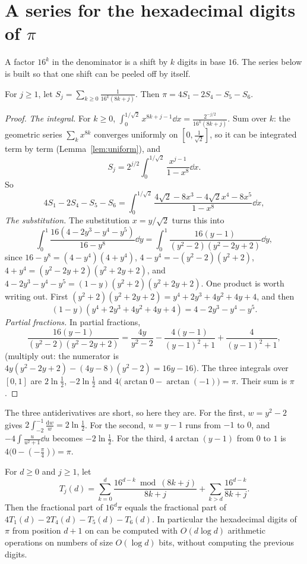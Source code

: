 \section{A series for the hexadecimal digits of $\pi$}

A factor $16^k$ in the denominator is a shift by $k$ digits in base $16$. The series below is built so that one shift can be peeled off by itself.

\begin{theorem}\label{thm:bbp}
For $j\ge1$, let $S_j=\sum_{k\ge0}\frac1{16^k(8k+j)}$. Then $\pi=4S_1-2S_4-S_5-S_6$.
\end{theorem}

\begin{proof}
\emph{The integral.}
For $k\ge0$, $\int_0^{1/\sqrt2}x^{8k+j-1}\dd x=\frac{2^{-j/2}}{16^k(8k+j)}$. Sum over $k$: the geometric series $\sum_kx^{8k}$ converges uniformly on $[0,\frac1{\sqrt2}]$, so it can be integrated term by term (Lemma~\ref{lem:uniform}), and
\[
S_j=2^{j/2}\int_0^{1/\sqrt2}\frac{x^{j-1}}{1-x^8}\dd x.
\]
So
\[
4S_1-2S_4-S_5-S_6=\int_0^{1/\sqrt2}\frac{4\sqrt2-8x^3-4\sqrt2x^4-8x^5}{1-x^8}\dd x,
\]
\emph{The substitution.}
The substitution $x=y/\sqrt2$ turns this into
\[
\int_0^1\frac{16(4-2y^3-y^4-y^5)}{16-y^8}\dd y=\int_0^1\frac{16(y-1)}{(y^2-2)(y^2-2y+2)}\dd y,
\]
since $16-y^8=(4-y^4)(4+y^4)$, $4-y^4=-(y^2-2)(y^2+2)$, $4+y^4=(y^2-2y+2)(y^2+2y+2)$, and $4-2y^3-y^4-y^5=(1-y)(y^2+2)(y^2+2y+2)$. One product is worth writing out. First $(y^2+2)(y^2+2y+2)=y^4+2y^3+4y^2+4y+4$, and then
\[
(1-y)(y^4+2y^3+4y^2+4y+4)=4-2y^3-y^4-y^5.
\]
\emph{Partial fractions.}
In partial fractions,
\[
\frac{16(y-1)}{(y^2-2)(y^2-2y+2)}=\frac{4y}{y^2-2}-\frac{4(y-1)}{(y-1)^2+1}+\frac4{(y-1)^2+1},
\]
(multiply out: the numerator is $4y(y^2-2y+2)-(4y-8)(y^2-2)=16y-16$). The three integrals over $[0,1]$ are $2\ln\frac12$, $-2\ln\frac12$ and $4\bigl(\arctan0-\arctan(-1)\bigr)=\pi$. Their sum is $\pi$.
\end{proof}

The three antiderivatives are short, so here they are. For the first, $w=y^2-2$ gives $2\int_{-2}^{-1}\frac{\mathrm dw}w=2\ln\frac12$. For the second, $u=y-1$ runs from $-1$ to $0$, and $-4\int\frac{u}{u^2+1}\dd u$ becomes $-2\ln\frac12$. For the third, $4\arctan(y-1)$ from $0$ to $1$ is $4\bigl(0-(-\frac\pi4)\bigr)=\pi$.

\begin{proposition}\label{prop:digits}
For $d\ge0$ and $j\ge1$, let
\[
T_j(d)=\sum_{k=0}^d\frac{16^{d-k}\bmod(8k+j)}{8k+j}+\sum_{k>d}\frac{16^{d-k}}{8k+j}.
\]
Then the fractional part of $16^d\pi$ equals the fractional part of $4T_1(d)-2T_4(d)-T_5(d)-T_6(d)$. In particular the hexadecimal digits of $\pi$ from position $d+1$ on can be
computed with $O(d\log d)$ arithmetic operations on numbers of size $O(\log d)$ bits, without computing the previous digits.
\end{proposition}

